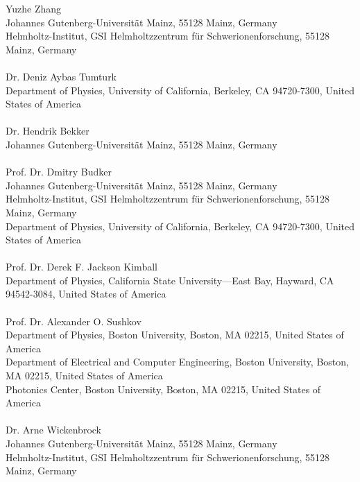 \documentclass{WileyMSP-template}
\begin{document}
\begin{affiliations}
Yuzhe Zhang\\
Johannes Gutenberg-Universit{\"a}t Mainz, 55128 Mainz, Germany\\
Helmholtz-Institut, GSI Helmholtzzentrum f{\"u}r Schwerionenforschung, 55128 Mainz, Germany\\
\,\\
Dr. Deniz Aybas Tumturk\\
Department of Physics, University of California, Berkeley, CA 94720-7300, United States of America\\
\,\\
Dr. Hendrik Bekker\\
Johannes Gutenberg-Universit{\"a}t Mainz, 55128 Mainz, Germany\\
\,\\
Prof. Dr. Dmitry Budker\\
Johannes Gutenberg-Universit{\"a}t Mainz, 55128 Mainz, Germany\\
Helmholtz-Institut, GSI Helmholtzzentrum f{\"u}r Schwerionenforschung, 55128 Mainz, Germany\\
Department of Physics, University of California, Berkeley, CA 94720-7300, United States of America\\
\,\\
Prof. Dr. Derek F. Jackson Kimball\\
Department of Physics, California State University—East Bay, Hayward, CA 94542-3084, United States of America\\
\,\\
Prof. Dr. Alexander O. Sushkov\\
Department of Physics, Boston University, Boston, MA 02215, United States of America\\
Department of Electrical and Computer Engineering, Boston University, Boston, MA 02215, United States of America\\
Photonics Center, Boston University, Boston, MA 02215, United States of America\\
\,\\
Dr. Arne Wickenbrock\\
Johannes Gutenberg-Universit{\"a}t Mainz, 55128 Mainz, Germany\\
Helmholtz-Institut, GSI Helmholtzzentrum f{\"u}r Schwerionenforschung, 55128 Mainz, Germany\\

\end{affiliations}
\end{document}
